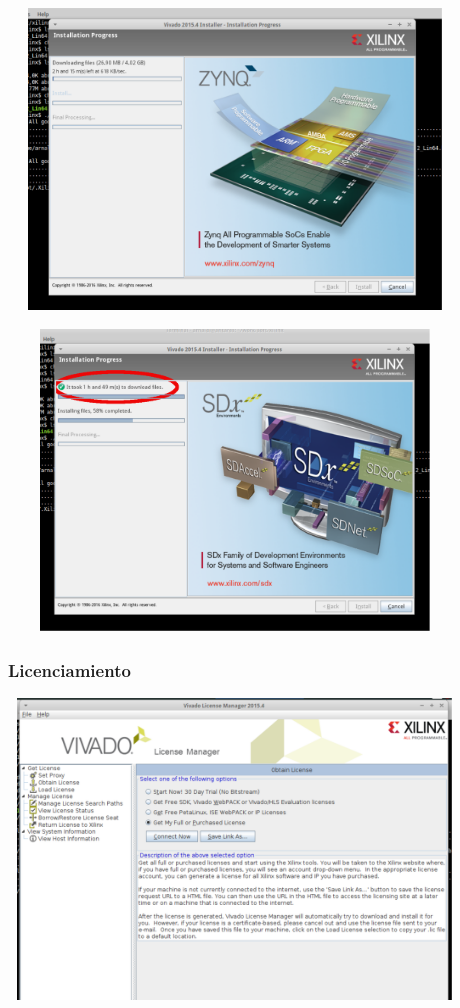 \documentclass[a4paper,11pt]{article}
\begin{document}
    \begin{center}
    \includegraphics[height=8cm,width=12cm]{vivado_installer_8}
    \end{center}

    \begin{center}
    \includegraphics[height=8cm,width=12cm]{vivado_installer_9}
    \end{center}

\subsubsection{Licenciamiento}

    \begin{center}
    \includegraphics[height=8cm,width=12cm]{vivado_installer_10}
    \end{center}
\end{document}
